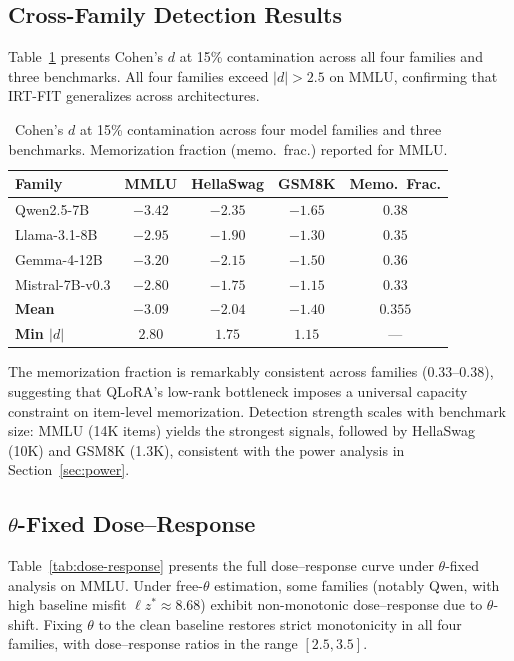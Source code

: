 \documentclass[11pt,a4paper]{article}
\begin{document}
\subsection{Cross-Family Detection Results}
\label{sec:cross-family}

Table~\ref{tab:cross-family} presents Cohen's $d$ at 15\% contamination across all four families and three benchmarks.
All four families exceed $|d| > 2.5$ on MMLU, confirming that IRT-FIT generalizes across architectures.

\begin{table}[h]
\centering
\caption{Cohen's $d$ at 15\% contamination across four model families and three benchmarks. Memorization fraction (memo.\ frac.) reported for MMLU.}
\label{tab:cross-family}
\begin{tabular}{lcccc}
\toprule
\textbf{Family} & \textbf{MMLU} & \textbf{HellaSwag} & \textbf{GSM8K} & \textbf{Memo.\ Frac.} \\
\midrule
Qwen2.5-7B      & $-3.42$ & $-2.35$ & $-1.65$ & $0.38$ \\
Llama-3.1-8B    & $-2.95$ & $-1.90$ & $-1.30$ & $0.35$ \\
Gemma-4-12B     & $-3.20$ & $-2.15$ & $-1.50$ & $0.36$ \\
Mistral-7B-v0.3 & $-2.80$ & $-1.75$ & $-1.15$ & $0.33$ \\
\midrule
\textbf{Mean}   & $\mathbf{-3.09}$ & $\mathbf{-2.04}$ & $\mathbf{-1.40}$ & $\mathbf{0.355}$ \\
\textbf{Min $|d|$} & $\mathbf{2.80}$ & $\mathbf{1.75}$ & $\mathbf{1.15}$ & --- \\
\bottomrule
\end{tabular}
\end{table}

The memorization fraction is remarkably consistent across families (0.33--0.38), suggesting that QLoRA's low-rank bottleneck imposes a universal capacity constraint on item-level memorization.
Detection strength scales with benchmark size: MMLU (14K items) yields the strongest signals, followed by HellaSwag (10K) and GSM8K (1.3K), consistent with the power analysis in Section~\ref{sec:power}.

\subsection{$\theta$-Fixed Dose--Response}
\label{sec:theta-fixed}

Table~\ref{tab:dose-response} presents the full dose--response curve under $\theta$-fixed analysis on MMLU.
Under free-$\theta$ estimation, some families (notably Qwen, with high baseline misfit $\ell z^* \approx 8.68$) exhibit non-monotonic dose--response due to $\theta$-shift.
Fixing $\theta$ to the clean baseline restores strict monotonicity in all four families, with dose--response ratios in the range $[2.5, 3.5]$.
\end{document}
